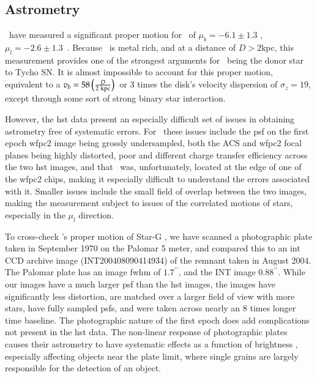 \subsection{Astrometry}
\rl\ have measured a significant proper motion for \starg\ of $\mu_b=-6.1 \pm 1.3$ \masyr, $\mu_l=-2.6 \pm 1.3$\ \masyr. Because \starg\ is metal rich, and at a distance of $D>2$kpc, this measurement provides one of the strongest arguments for \starg\ being the donor star to Tycho SN. It is almost impossible to account for this proper motion, equivalent to a $v_b=58\left({{D}\over{2\rm{~kpc}}}\right)$\kms\ or 3 times the disk's velocity dispersion of $\sigma_z=19$\kms, except through some sort of strong binary star interaction.  

However, the \gls{hst} data present an especially difficult set of issues in obtaining astrometry free of systematic errors. For \starg\ these issues include the \gls{psf} on the first epoch \gls{wfpc2} image being grossly undersampled, both the ACS and \gls{wfpc2} focal planes being highly distorted,  poor and different charge transfer efficiency across the two \gls{hst} images, and that \starg\ was, unfortunately, located at the edge of one of the \gls{wfpc2} chips, making it especially difficult to understand the errors associated with it. Smaller issues include the small field of overlap between the two images, making the measurement subject to issues of the correlated motions of stars, especially in the $\mu_l$ direction.

To cross-check \rl's proper motion of Star-G , we have scanned a photographic plate taken in
September 1970 on the Palomar 5 meter, and compared this to an \gls{int} CCD archive image (INT200408090414934) of the remnant taken in
August 2004. The Palomar plate has an image \gls{fwhm} of $1.7^{\prime\prime}$, and the INT image $0.88^{\prime\prime}$. While our images have a much larger \gls{psf} than the \gls{hst} images, the images have significantly less distortion, are matched over a larger field of view with more stars, have fully sampled \glspl{psf}, and were taken across nearly an 8 times longer time baseline. The photographic nature of the first epoch does add complications not present in the \gls{hst} data. The non-linear response of photographic plates causes their astrometry to have systematic effects as a function of brightness \citep{2001ASPC..232..311C}, especially affecting objects near the plate limit, where  single grains are largely responsible for the detection of an object. 

